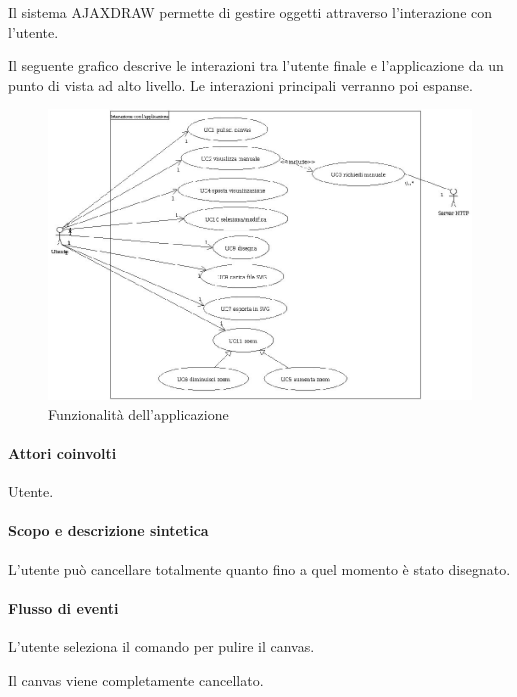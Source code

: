 Il sistema AJAXDRAW permette di gestire oggetti attraverso l'interazione con l'utente.

Il seguente grafico descrive le interazioni tra l'utente finale e l'applicazione da un punto di vista ad alto livello. Le interazioni principali verranno poi espanse.
\begin{figure}[!ht]
\centering
\vspace{20pt} 
\includegraphics{UCInterazione.jpg}
\caption{Funzionalit\`a dell'applicazione}
\end{figure}


\paragraph{Attori coinvolti} Utente.
\paragraph{Scopo e descrizione sintetica}
L'utente pu\`o cancellare totalmente quanto fino a quel momento \`e stato disegnato.
\paragraph{Flusso di eventi}
\begin{elenconumerato}[\textbf{}]{\subsubsecindent}
\item L'utente seleziona il comando per pulire il canvas. 
\item Il canvas viene completamente cancellato.
\end{elenconumerato}
